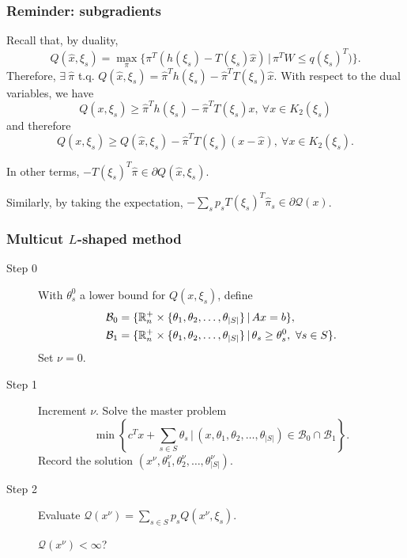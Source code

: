 \documentclass{beamer}
\begin{document}
\begin{frame}
\frametitle{Reminder: subgradients}

Recall that, by {\blue duality},
\[
Q(\hat{x}, \xi_s) =
\max_{\pi} \lbrace \pi^T(h(\xi_s)-T(\xi_s)\hat{x}) \,|\, \pi^TW \leq q(\xi_s)^T) \rbrace.
\]
Therefore, $\exists\ \hat{\pi}$ t.q.
$Q(\hat{x}, \xi_s) = \hat{\pi}^Th(\xi_s)-\hat{\pi}^TT(\xi_s)\hat{x}$.
With respect to the dual variables, we have
\[
Q(x, \xi_s) \geq \hat{\pi}^Th(\xi_s)-\hat{\pi}^TT(\xi_s) x,
\ \forall x \in K_2(\xi_s)
\]
and therefore
\[
Q(x, \xi_s) \geq Q({\hat{x}, \xi_s}) - \hat{\pi}^TT(\xi_s) (x-\hat{x}),
\ \forall x \in K_2(\xi_s).
\]

In other terms, $-T(\xi_s)^T\hat{\pi} \in \partial Q(\hat{x}, \xi_s)$.

\mbox{}

Similarly, by taking the expectation, $- \sum_s p_s T(\xi_s)^T\hat{\pi}_s \in \partial \mathcal{Q}(x)$.

\end{frame}

\begin{frame}
\frametitle{Multicut $L$-shaped method}
	
\begin{description}
\item[Step 0]
With $\theta_s^0$ a lower bound for $Q(x, \xi_s)$, define
\begin{align*}
\mathcal{B}_0 &= \lbrace {\mathbb{R}}_n^+ \times \lbrace \theta_1,
\theta_2,\ldots, \theta_{|S|}\rbrace \,|\, Ax = b \rbrace, \\
\mathcal{B}_1 &= \lbrace {\mathbb{R}}_n^+ \times \lbrace \theta_1,
\theta_2,\ldots, \theta_{|S|}\rbrace \,|\, \theta_s \geq \theta_s^0,\
\forall s \in S \rbrace.
\end{align*}
Set $\nu = 0$.
\item[Step 1]
Increment $\nu$.
Solve the master problem
\[
\min \left\lbrace c^Tx+\sum_{s \in S} \theta_s \,|\,
(x,\theta_1,\theta_2,\ldots,\theta_{|S|}) \in \mathcal{B}_0 \cap \mathcal{B}_1 \right\rbrace.
\]
Record the solution $( x^{\nu}, \theta_1^{\nu}, \theta_2^{\nu},\ldots,
\theta_{|S|}^{\nu} )$.
\item[Step 2]
Evaluate $\mathcal{Q}(x^{\nu}) = \sum_{s \in S} p_s Q(x^{\nu}, \xi_s)$.
		
		$\mathcal{Q}(x^{\nu}) < \infty$?
\end{description}
	
\end{frame}
\end{document}

